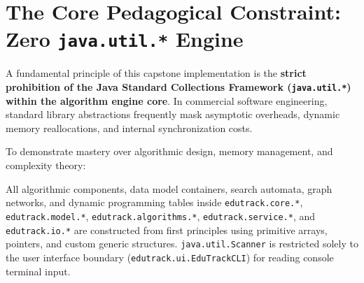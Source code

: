 \section{The Core Pedagogical Constraint: Zero \texttt{java.util.*} Engine}
A fundamental principle of this capstone implementation is the \textbf{strict prohibition of the Java Standard Collections Framework (\texttt{java.util.*}) within the algorithm engine core}. In commercial software engineering, standard library abstractions frequently mask asymptotic overheads, dynamic memory reallocations, and internal synchronization costs. 

To demonstrate mastery over algorithmic design, memory management, and complexity theory:
\begin{tcolorbox}[colback=darkslate!5!white,colframe=primaryblue,title=\textbf{The Zero-\texttt{java.util.*} Core Invariant}]
All algorithmic components, data model containers, search automata, graph networks, and dynamic programming tables inside \texttt{edutrack.core.*}, \texttt{edutrack.model.*}, \texttt{edutrack.algorithms.*}, \texttt{edutrack.service.*}, and \texttt{edutrack.io.*} are constructed from first principles using primitive arrays, pointers, and custom generic structures. \texttt{java.util.Scanner} is restricted solely to the user interface boundary (\texttt{edutrack.ui.EduTrackCLI}) for reading console terminal input.
\end{tcolorbox}

